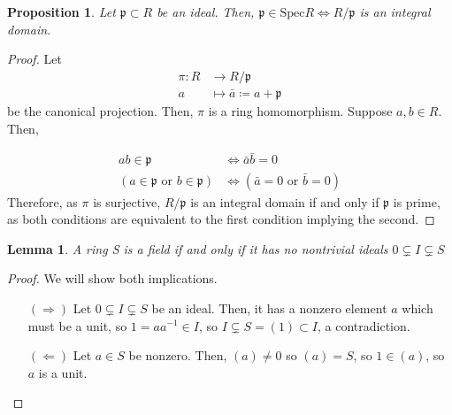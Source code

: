 \documentclass[11pt]{article}
\newtheorem{lemma}[theorem]{Lemma}
\newtheorem{prop}[theorem]{Proposition}
\theoremstyle{definition}
\begin{document}
        \begin{prop}
            Let $\mathfrak{p} \subset R$ be an ideal.
            Then, $\mathfrak{p} \in \text{Spec}R \Leftrightarrow R/\mathfrak{p}$ is an integral domain.
        \end{prop}
            \begin{proof}
                Let \begin{align}
                    \pi: R &\rightarrow R/\mathfrak{p} \nonumber \\
                        a &\mapsto \bar{a} \coloneqq a + \mathfrak{p} \nonumber
                \end{align}
                be the canonical projection.
                Then, $\pi$ is a ring homomorphism.
                Suppose $a, b \in R$.
                Then,

                \begin{align}
                    ab \in \mathfrak{p} &\Leftrightarrow \bar{a}\bar{b} = 0 \nonumber \\
                    (a \in \mathfrak{p} \text{ or } b \in \mathfrak{p}) &\Leftrightarrow (\bar{a} = 0 \text{ or } \bar{b} = 0) \nonumber
                \end{align}
                Therefore, as $\pi$ is surjective, $R/\mathfrak{p}$ is an integral domain if and only if $\mathfrak{p}$ is prime,
                as both conditions are equivalent to the first condition implying the second.
            \end{proof}

        \begin{lemma}
                     A ring S is a field if and only if it has no nontrivial ideals $ 0 \subsetneq I \subsetneq S$
        \end{lemma}
                \begin{proof}
                    We will show both implications.

                    \begin{itemize}
                        \item [$(\Rightarrow)$] Let $ 0 \subsetneq I \subsetneq S$ be an ideal.
                        Then, it has a nonzero element $a$ which must be a unit, so
                        $1 = a a^{-1} \in I$, so $I \subsetneq S = (1) \subset I$, a contradiction.

                        \item[$(\Leftarrow)$] Let $a \in S$ be nonzero.
                        Then, $(a) \neq 0$ so $(a) = S$, so $1 \in (a)$, so $a$ is a unit.
                    \end{itemize}

                \end{proof}
    
\end{document}
